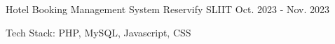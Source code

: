

\begin{cventries}

  \cventry
    {Hotel Booking Management System} %
    {Reservify  \href{https://github.com/nmdra/Reservify/}{\faGithub}} %
    {SLIIT} %
    {Oct. 2023 - Nov. 2023} %
    {
      \begin{cvitems} %
        \item {Tech Stack: PHP, MySQL, Javascript, CSS}
      \end{cvitems}
    }

\end{cventries}
